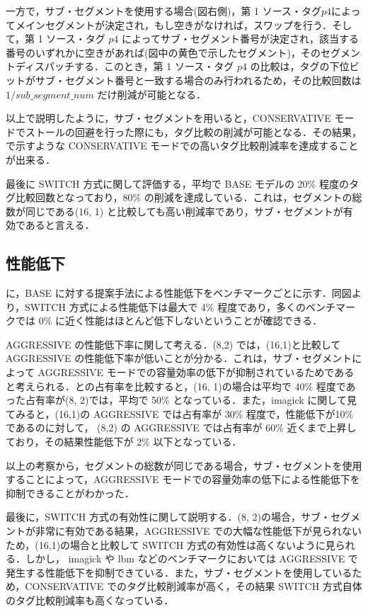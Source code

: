 一方で，サブ・セグメントを使用する場合(図右側)，第 1 ソース・タグ$p4$によってメインセグメントが決定され，もし空きがなければ，スワップを行う．そして，第 1 ソース・タグ $p4$ によってサブ・セグメント番号が決定され，該当する番号のいずれかに空きがあれば(図中の黄色で示したセグメント)，そのセグメントディスパッチする．このとき，第 1 ソース・タグ $p4$ の比較は，タグの下位ビットがサブ・セグメント番号と一致する場合のみ行われるため，その比較回数は$1/sub\_segment\_num$ だけ削減が可能となる．

以上で説明したように，サブ・セグメントを用いると，CONSERVATIVE モードでストールの回避を行った際にも，タグ比較の削減が可能となる．その結果，で示すような CONSERVATIVE モードでの高いタグ比較削減率を達成することが出来る．

最後に SWITCH 方式に関して評価する，平均で BASE モデルの 20\% 程度のタグ比較回数となっており，80\% の削減を達成している．これは，セグメントの総数が同じである(16, 1) と比較しても高い削減率であり，サブ・セグメントが有効であると言える．

\subsection{性能低下}
に，BASE に対する提案手法による性能低下をベンチマークごとに示す．同図より，SWITCH 方式による性能低下は最大で 4\% 程度であり，多くのベンチマークでは 0\% に近く性能はほとんど低下しないということが確認できる．

AGGRESSIVE の性能低下率に関して考える．(8,2) では，(16,1)と比較して AGGRESSIVE の性能低下率が低いことが分かる．これは，サブ・セグメントによって AGGRESSIVE モードでの容量効率の低下が抑制されているためであると考えられる．との占有率を比較すると，(16, 1)の場合は平均で 40\% 程度であった占有率が(8, 2)では，平均で 50\% となっている．また，imagick に関して見てみると，(16,1)の AGGRESSIVE では占有率が 30\% 程度で，性能低下が10\% であるのに対して， (8,2) の AGGRESSIVE では占有率が 60\% 近くまで上昇しており，その結果性能低下が 2\% 以下となっている．

以上の考察から，セグメントの総数が同じである場合，サブ・セグメントを使用することによって，AGGRESSIVE モードでの容量効率の低下による性能低下を抑制できることがわかった．

最後に，SWITCH 方式の有効性に関して説明する．(8, 2)の場合，サブ・セグメントが非常に有効である結果，AGGRESSIVE での大幅な性能低下が見られないため，(16,1)の場合と比較して SWITCH 方式の有効性は高くないように見られる．しかし， imagick や lbm などのベンチマークにおいては AGGRESSIVE で発生する性能低下を抑制できている．また，サブ・セグメントを使用しているため，CONSERVATIVE でのタグ比較削減率が高く，その結果 SWITCH 方式自体のタグ比較削減率も高くなっている．

